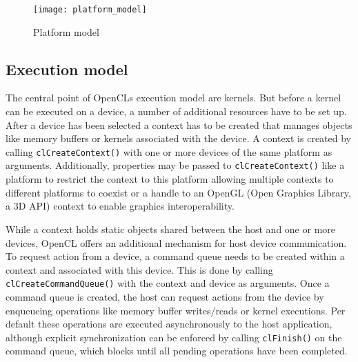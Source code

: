 \begin{figure} 
\centering
\texttt{[image: platform\_model]}
\caption{Platform model}
\label{fig:platform_model}
\end{figure}

\subsection{Execution model}
\label{sec:execution_model}
The central point of OpenCLs execution model are kernels. But before a kernel can be executed on a device, a number of additional resources have to be set up.
After a device has been selected a context has to be created that manages objects like memory buffers or kernels associated with the device. A context is created by calling \lstinline!clCreateContext()! with one or more devices of the same platform as arguments. Additionally, properties may be passed to \lstinline!clCreateContext()! like a platform to restrict the context to this platform allowing multiple contexts to different platforms to coexist or a handle to an OpenGL (Open Graphics Library, a 3D API) context to enable graphics interoperability. \cite[p.22]{opencl_book}

While a context holds static objects shared between the host and one or more devices, OpenCL offers an additional mechanism for host device communication. To request action from a device, a command queue needs to be created within a context and associated with this device. This is done by calling \lstinline!clCreateCommandQueue()! with the context and device as arguments. Once a command queue is created, the host can request actions from the device by enqueueing operations like memory buffer writes/reads or kernel executions. Per default these operations are executed asynchronously to the host application, although explicit synchronization can be enforced by calling \lstinline!clFinish()! on the command queue, which blocks until all pending operations have been completed. \cite[p.22, 23, 26]{opencl_book}

